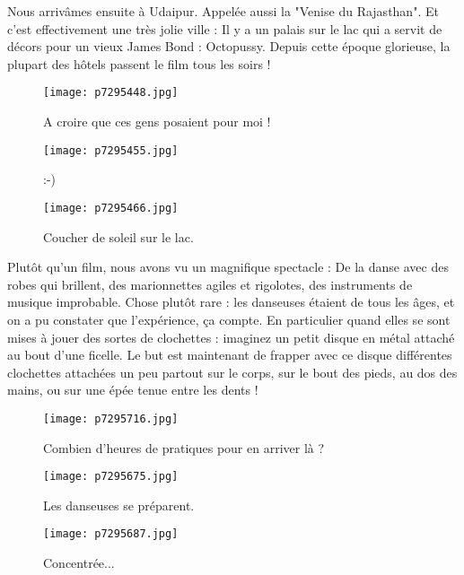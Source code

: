 \documentclass{book}
\begin{document}
Nous arrivâmes ensuite à Udaipur. Appelée aussi la "Venise du Rajasthan". Et c'est effectivement une très jolie ville : Il y a un palais sur le lac qui a servit de décors pour un vieux James Bond : Octopussy. Depuis cette époque glorieuse, la plupart des hôtels passent le film tous les soirs !


\begin{figure}[h]
\centering
\texttt{[image: p7295448.jpg]}
\caption*{A croire que ces gens posaient pour moi !}
\end{figure}


\begin{figure}[h]
\centering
\texttt{[image: p7295455.jpg]}
\caption*{:-)}
\end{figure}


\begin{figure}[h]
\centering
\texttt{[image: p7295466.jpg]}
\caption*{Coucher de soleil sur le lac.}
\end{figure}

Plutôt qu'un film, nous avons vu un magnifique spectacle : De la danse avec des robes qui brillent, des marionnettes agiles et rigolotes, des instruments de musique improbable. Chose plutôt rare : les danseuses étaient de tous les âges, et on a pu constater que l'expérience, ça compte. En particulier quand elles se sont mises à jouer des sortes de clochettes : imaginez un petit disque en métal attaché au bout d'une ficelle. Le but est maintenant de frapper avec ce disque différentes clochettes attachées un peu partout sur le corps, sur le bout des pieds, au dos des mains, ou sur une épée tenue entre les dents !


\begin{figure}[h]
\centering
\texttt{[image: p7295716.jpg]}
\caption*{Combien d'heures de pratiques pour en arriver là ?}
\end{figure}


\begin{figure}[h]
\centering
\texttt{[image: p7295675.jpg]}
\caption*{Les danseuses se préparent.}
\end{figure}


\begin{figure}[h]
\centering
\texttt{[image: p7295687.jpg]}
\caption*{Concentrée...}
\end{figure}
\end{document}
